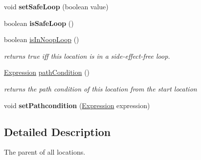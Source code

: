 \begin{DoxyCompactItemize}
\item 
\hypertarget{interfaceedu_1_1udel_1_1cis_1_1vsl_1_1civl_1_1model_1_1IF_1_1location_1_1Location_ad2c10cb0fe257c4d926daeb19b7f06ae}{}void {\bfseries set\+Safe\+Loop} (boolean value)\label{interfaceedu_1_1udel_1_1cis_1_1vsl_1_1civl_1_1model_1_1IF_1_1location_1_1Location_ad2c10cb0fe257c4d926daeb19b7f06ae}

\item 
\hypertarget{interfaceedu_1_1udel_1_1cis_1_1vsl_1_1civl_1_1model_1_1IF_1_1location_1_1Location_acddb3d4074e9d9554143f1a15642e48c}{}boolean {\bfseries is\+Safe\+Loop} ()\label{interfaceedu_1_1udel_1_1cis_1_1vsl_1_1civl_1_1model_1_1IF_1_1location_1_1Location_acddb3d4074e9d9554143f1a15642e48c}

\item 
boolean \hyperlink{interfaceedu_1_1udel_1_1cis_1_1vsl_1_1civl_1_1model_1_1IF_1_1location_1_1Location_ab0c42f2259fc848e5fce432940c370aa}{is\+In\+Noop\+Loop} ()
\begin{DoxyCompactList}\small\item\em returns true iff this location is in a side-\/effect-\/free loop. \end{DoxyCompactList}\item 
\hyperlink{interfaceedu_1_1udel_1_1cis_1_1vsl_1_1civl_1_1model_1_1IF_1_1expression_1_1Expression}{Expression} \hyperlink{interfaceedu_1_1udel_1_1cis_1_1vsl_1_1civl_1_1model_1_1IF_1_1location_1_1Location_ac4d45b92dfc4d88ad0abf0ef253ee3a0}{path\+Condition} ()
\begin{DoxyCompactList}\small\item\em returns the path condition of this location from the start location \end{DoxyCompactList}\item 
\hypertarget{interfaceedu_1_1udel_1_1cis_1_1vsl_1_1civl_1_1model_1_1IF_1_1location_1_1Location_a4817f615dc3c8e7864b6d0879712523a}{}void {\bfseries set\+Pathcondition} (\hyperlink{interfaceedu_1_1udel_1_1cis_1_1vsl_1_1civl_1_1model_1_1IF_1_1expression_1_1Expression}{Expression} expression)\label{interfaceedu_1_1udel_1_1cis_1_1vsl_1_1civl_1_1model_1_1IF_1_1location_1_1Location_a4817f615dc3c8e7864b6d0879712523a}

\end{DoxyCompactItemize}


\subsection{Detailed Description}
The parent of all locations. 

